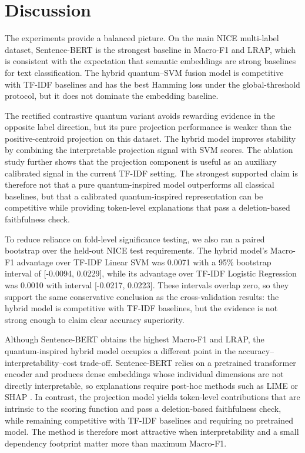 \documentclass[runningheads]{llncs}
\begin{document}
\section{Discussion}
The experiments provide a balanced picture. On the main NICE multi-label
dataset, Sentence-BERT is the strongest baseline in Macro-F1 and LRAP, which is
consistent with the expectation that semantic embeddings are strong baselines
for text classification. The hybrid quantum--SVM fusion model is competitive
with TF-IDF baselines and has the best Hamming loss under the global-threshold
protocol, but it does not dominate the embedding baseline.

The rectified contrastive quantum variant avoids rewarding evidence in the
opposite label direction, but its pure projection performance is weaker than
the positive-centroid projection on this dataset. The hybrid model improves
stability by combining the interpretable projection signal with SVM scores. The
ablation study further shows that the projection component is useful as an
auxiliary calibrated signal in the current TF-IDF setting. The
strongest supported claim is therefore not that a pure
quantum-inspired model outperforms all classical baselines, but that a
calibrated quantum-inspired representation can be competitive while providing
token-level explanations that pass a deletion-based faithfulness check.

To reduce reliance on fold-level significance testing, we also ran a paired
bootstrap over the held-out NICE test requirements. The hybrid model's Macro-F1
advantage over TF-IDF Linear SVM was 0.0071 with a 95\% bootstrap interval of
[-0.0094, 0.0229], while its advantage over TF-IDF Logistic Regression was
0.0010 with interval [-0.0217, 0.0223]. These intervals overlap zero, so they
support the same conservative conclusion as the cross-validation results: the
hybrid model is competitive with TF-IDF baselines, but the evidence is not
strong enough to claim clear accuracy superiority.

Although Sentence-BERT obtains the highest Macro-F1 and LRAP, the
quantum-inspired hybrid model occupies a different point in the
accuracy--interpretability--cost trade-off. Sentence-BERT relies on a pretrained
transformer encoder and produces dense embeddings whose individual dimensions
are not directly interpretable, so explanations require post-hoc methods such
as LIME or SHAP \cite{ribeiro2016lime,lundberg2017shap}. In contrast, the
projection model yields token-level contributions that are intrinsic to the
scoring function and pass a deletion-based faithfulness check, while remaining
competitive with TF-IDF baselines and requiring no pretrained model. The method
is therefore most attractive when interpretability and a small dependency
footprint matter more than maximum Macro-F1.
\end{document}
